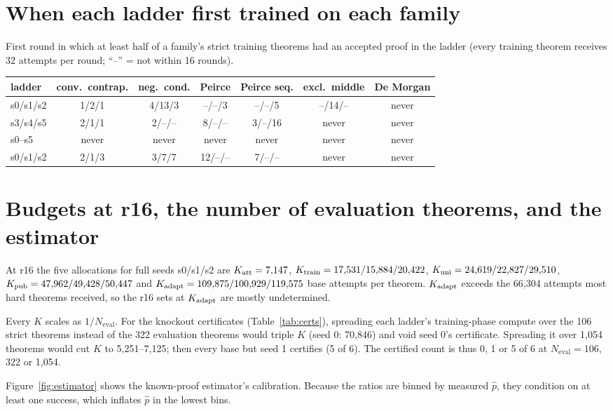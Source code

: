 \section{When each ladder first trained on each family}
\label{app:shares}
First round in which at least half of a family's strict training theorems had an accepted proof in the ladder (every
training theorem receives 32 attempts per round; ``--'' = not within 16 rounds).
\begin{center}\small
\begin{tabular}{lcccccc}
\toprule
ladder & conv.\ contrap. & neg.\ cond. & Peirce & Peirce seq. & excl.\ middle & De Morgan \\
\midrule
\Kfull{} s0/s1/s2 & 1/2/1 & 4/13/3 & --/--/3 & --/--/5 & --/14/-- & never \\
\Kfull{} s3/s4/s5 & 2/1/1 & 2/--/-- & 8/--/-- & 3/--/16 & never & never \\
\Kko{} s0--s5 & never & never & never & never & never & never \\
\Kdose{} s0/s1/s2 & 2/1/3 & 3/7/7 & 12/--/-- & 7/--/-- & never & never \\
\bottomrule
\end{tabular}
\end{center}

\section{Budgets at r16, the number of evaluation theorems, and the estimator}
\label{app:budgets}
At r16 the five allocations for full seeds s0/s1/s2 are $K_{\mathrm{att}} = 7{,}147$, $K_{\mathrm{train}} = 17{,}531/15{,}884/20{,}422$,
$K_{\mathrm{uni}} = 24{,}619/22{,}827/29{,}510$, $K_{\mathrm{pub}} = 47{,}962/49{,}428/50{,}447$ and
$K_{\mathrm{adapt}} = 109{,}875/100{,}929/119{,}575$ base attempts per theorem. $K_{\mathrm{adapt}}$ exceeds the 66,304 attempts most hard
theorems received, so the r16 sets at $K_{\mathrm{adapt}}$ are mostly undetermined.

Every $K$ scales as $1/N_{\mathrm{eval}}$. For the knockout certificates (Table~\ref{tab:certs}), spreading each
ladder's training-phase compute over the 106 strict theorems instead of the 322 evaluation theorems would triple $K$
(seed 0: 70,846) and void seed 0's certificate. Spreading it over 1,054 theorems would cut $K$ to 5,251--7,125;
then every base but seed 1 certifies (5 of 6). The certified count is thus 0, 1 or 5 of 6 at $N_{\mathrm{eval}} = 106$,
322 or 1,054.

Figure~\ref{fig:estimator} shows the known-proof estimator's calibration. Because the ratios are binned by measured
$\hat p$, they condition on at least one success, which inflates $\hat p$ in the lowest bins.

